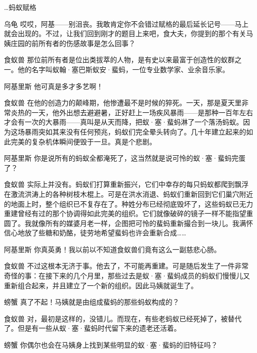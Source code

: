 \begin{dialog}{…蚂蚁赋格}
\begin{dialogue}
\item[乌龟]哎哎，阿基——别沮丧。我敢肯定你不会错过赋格的最后延长记号——马上就会出现的。不过，让我们回到刚才的题目上来吧，食大夫，你提到的那个有关马姨庄园的前所有者的伤感故事是怎么回事？

\item[食蚁兽]那位前所有者是位出类拔萃的人物，是有史以来最富于创造性的蚁群之一。他的名字叫蚁翰·塞巴斯蚁安·蜚蚂，一位专业数学家、业余音乐家。

\item[阿基里斯]他可真是多才多艺啊！

\item[食蚁兽]在他的创造力的颠峰期，他惨遭最不是时候的猝死。一天，那是夏天里非常炎热的一天，他外出想去避避暑，正好赶上一场疾风暴雨——是那种一百年左右才会有一次的大暴雨——真叫是从天而降，把蚁·塞·蜚蚂淋了一个落汤蚂蚁。因为这场暴雨突如其来没有任何预兆，蚂蚁们完全晕头转向了。几十年建立起来的如此完美的复杂机体瞬间便毁于一旦。真是个悲剧。

\item[阿基里斯]你是说所有的蚂蚁全都淹死了，这当然就是说可怜的蚁·塞·蜚蚂完蛋了？

\item[食蚁兽]实际上并没有。蚂蚁们打算重新振兴，它们中幸存的每只蚂蚁都爬到飘浮在激流洪涛上的各种树枝木棍上。可是在洪水消退、蚂蚁们重新回到它们巢穴附近的地面上时，整个组织已不复存在了。种姓分布已经彻底毁坏了，这些蚂蚁已无力重建曾经有过的那个协调得如此完美的组织。它们就像破碎的镜子一样不能指望重圆了。我就像所有的媒婆月老一样，企图把可怜的蜚蚂重新撮合到一块儿。我满怀信心地放了些糖和奶酪，徒劳地希望蜚蚂也许会重新合成……

\item[阿基里斯]你真英勇！我以前以不知道食蚁兽们竟有这么一副慈悲心肠。

\item[食蚁兽]不过这根本无济于事。他去了，不可能再重建。可是随后发生了一件非常奇怪的事：在接下来的几个月里，那些过去是蚁·塞·蜚蚂成员的蚂蚁们慢慢儿又重新组合起来，并且建立了一个新的组织。因此马姨就诞生了。

\item[螃蟹]真了不起！马姨就是由组成蜚蚂的那些蚂蚁构成的？

\item[食蚁兽]对，最初是这样的，没错儿。而现在，有些老蚂蚁已经死掉了，被替代了。但是有一些从蚁·塞·蜚蚂时代留下来的遗老还活着。

\item[螃蟹]你偶尔也会在马姨身上找到某些明显的蚁·塞·蜚蚂的旧特征吗？


\end{dialogue}
\end{dialog}
